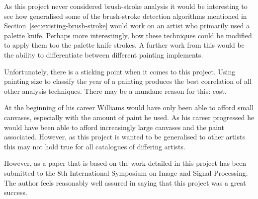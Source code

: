 As this project never considered brush-stroke analysis it would be interesting to see how 
generalised some of the brush-stroke detection algorithms mentioned in 
Section~\ref{sec:existing-brush-stroke} would work on an artist who primarily used a palette knife. Perhaps more interestingly, how these techniques could be modified to apply them too the palette 
knife strokes. A further work from this would be the ability to differentiate between different
painting implements.


Unfortunately, there is a sticking point when it comes to this project. Using painting size to 
classify the year of a painting produces the best correlation of all other analysis techniques.
There may be a mundane reason for this: cost.

At the beginning of his career Williams would have only been able to afford small canvases, 
especially with the amount of paint he used. As his career progressed he would have been able
to afford increasingly large canvases and the paint associated. However, as this project is wanted
to be generalised to other artists this may not hold true for all catalogues of differing artists.

However, as a paper that is based on the work detailed in this project has been submitted to the
8th International Symposium on Image and Signal Processing. The author feels reasonably well 
assured in saying that this project was a great success.

